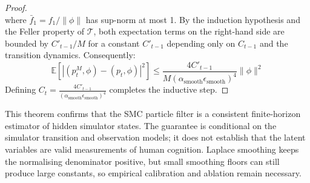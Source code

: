 \documentclass[11pt,a4paper]{report}
\begin{document}
\begin{proof}
\begin{equation}
\end{equation}
where $\bar{f}_1 = f_1 / \parallel \phi \parallel$ has sup-norm at most 1. By the induction hypothesis and the Feller property of $\mathcal{T}$, both expectation terms on the right-hand side are bounded by $C'_{t-1}/M$ for a constant $C'_{t-1}$ depending only on $C_{t-1}$ and the transition dynamics. Consequently:
\begin{equation}
    \mathbb{E}\left[ \left| (p_t^M, \phi) - (p_t, \phi) \right|^2 \right] \le \frac{4 C'_{t-1}}{M (\alpha_{\text{smooth}} \epsilon_{\text{smooth}})^4} \parallel \phi \parallel^2
\end{equation}
Defining $C_t = \frac{4 C'_{t-1}}{(\alpha_{\text{smooth}} \epsilon_{\text{smooth}})^4}$ completes the inductive step.
\end{proof}
This theorem confirms that the SMC particle filter is a consistent finite-horizon estimator of hidden simulator states. The guarantee is conditional on the simulator transition and observation models; it does not establish that the latent variables are valid measurements of human cognition. Laplace smoothing keeps the normalising denominator positive, but small smoothing floors can still produce large constants, so empirical calibration and ablation remain necessary.
\end{document}
